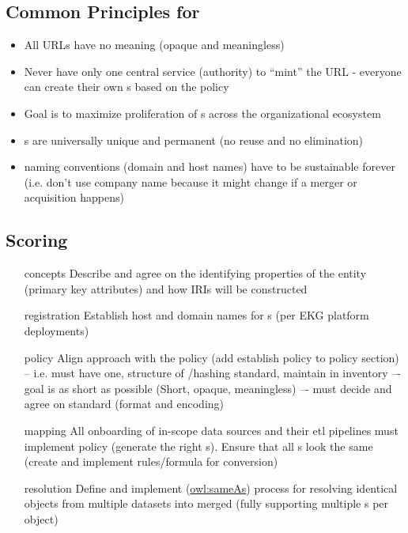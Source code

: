 \subsection*{Common Principles for }

\begin{itemize}
  \item All URLs have no meaning (opaque and meaningless)
  \item Never have only one central service (authority) to “mint” the URL - everyone can create their own
        s based on the policy
  \item Goal is to maximize proliferation of s across the organizational ecosystem
  \item {}s are universally unique and permanent (no reuse and no elimination)
  \item {} naming conventions (domain and host names) have to be sustainable forever
        (i.e. don’t use company name because it might change if a merger or acquisition happens)
\end{itemize}

\subsection*{Scoring}

\kgmmscoringlevelOne

\begin{itemize}[leftmargin=1.5in]

  \item [concepts] Describe and agree on the identifying properties of the entity (primary key
        attributes) and how IRIs will be constructed
  \item [registration] Establish host and domain names for s (per EKG platform deployments)
  \item [policy] Align approach with the  policy (add establish policy to policy section) -- i.e.
        must have one, structure of /hashing standard, maintain in inventory –- goal is as short
        as possible (Short, opaque, meaningless) –- must decide and agree on standard (format and encoding)
  \item [mapping] All onboarding of in-scope data sources and their \acrshort{etl} pipelines must implement policy
        (generate the right s).
        Ensure that all s look the same (create and implement rules/formula for conversion)
  \item [resolution] Define and implement (\href{https://www.w3.org/TR/owl-ref/#sameAs-def}{owl:sameAs}) process for
        resolving identical objects from multiple datasets into merged  (fully supporting
        multiple s per object)

\end{itemize}

